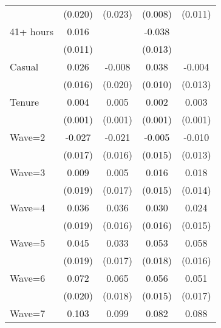 {\begin{tabular}{l*{4}{c}}
                    &     (0.020)         &     (0.023)         &     (0.008)         &     (0.011)         \\
41+ hours           &       0.016         &                     &      -0.038\sym{***}&                     \\
                    &     (0.011)         &                     &     (0.013)         &                     \\
Casual              &       0.026         &      -0.008         &       0.038\sym{***}&      -0.004         \\
                    &     (0.016)         &     (0.020)         &     (0.010)         &     (0.013)         \\
Tenure              &       0.004\sym{***}&       0.005\sym{***}&       0.002\sym{***}&       0.003\sym{***}\\
                    &     (0.001)         &     (0.001)         &     (0.001)         &     (0.001)         \\
Wave=2              &      -0.027         &      -0.021         &      -0.005         &      -0.010         \\
                    &     (0.017)         &     (0.016)         &     (0.015)         &     (0.013)         \\
Wave=3              &       0.009         &       0.005         &       0.016         &       0.018         \\
                    &     (0.019)         &     (0.017)         &     (0.015)         &     (0.014)         \\
Wave=4              &       0.036\sym{*}  &       0.036\sym{**} &       0.030\sym{*}  &       0.024\sym{*}  \\
                    &     (0.019)         &     (0.016)         &     (0.016)         &     (0.015)         \\
Wave=5              &       0.045\sym{**} &       0.033\sym{*}  &       0.053\sym{***}&       0.058\sym{***}\\
                    &     (0.019)         &     (0.017)         &     (0.018)         &     (0.016)         \\
Wave=6              &       0.072\sym{***}&       0.065\sym{***}&       0.056\sym{***}&       0.051\sym{***}\\
                    &     (0.020)         &     (0.018)         &     (0.015)         &     (0.017)         \\
Wave=7              &       0.103\sym{***}&       0.099\sym{***}&       0.082\sym{***}&       0.088\sym{***}\\

\end{tabular}}
